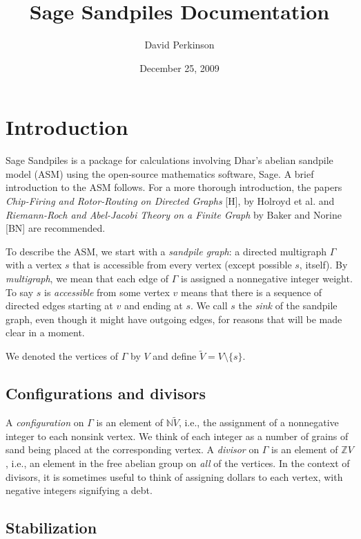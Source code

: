 \documentclass[letterpaper,10pt,english]{manual}
\title{Sage Sandpiles Documentation}
\date{December 25, 2009}
\author{David Perkinson}
\begin{document}
\maketitle
\tableofcontents




\chapter{Introduction}

Sage Sandpiles is a package for calculations involving Dhar's abelian sandpile
model (ASM) using the open-source mathematics software, Sage.  A brief
introduction to the ASM follows.  For a more thorough introduction, the papers
\emph{Chip-Firing and Rotor-Routing on Directed Graphs} {[}H{]}, by Holroyd et al. and
\emph{Riemann-Roch and Abel-Jacobi Theory on a Finite Graph} by Baker and Norine
{[}BN{]} are recommended.

To describe the ASM, we start with a \emph{sandpile graph}: a directed multigraph
$\Gamma$ with a vertex $s$ that is accessible from every vertex (except
possible $s$, itself).  By \emph{multigraph}, we mean that each edge of $\Gamma$ is
assigned a nonnegative integer weight.  To say $s$ is \emph{accessible} from some
vertex $v$ means that there is a sequence of directed edges starting at $v$ and
ending at $s$.  We call $s$ the \emph{sink} of the sandpile graph, even though it might have outgoing edges, for reasons that will be made clear in a moment.

We denoted the vertices of $\Gamma$ by $V$ and define $\tilde{V} = V\setminus\{s\}$.


\section{Configurations and divisors}

A \emph{configuration} on $\Gamma$ is an element of $\mathbb{N}\tilde{V}$, i.e., the
assignment of a nonnegative integer to each nonsink vertex.  We think of each
integer as a number of grains of sand being placed at the corresponding
vertex.  A \emph{divisor} on $\Gamma$ is an element of $\mathbb{Z}V$, i.e., an
element in the free abelian group on \emph{all} of the vertices.  In the context of
divisors, it is sometimes useful to think of assigning dollars to each vertex,
with negative integers signifying a debt.


\section{Stabilization}
\end{document}
